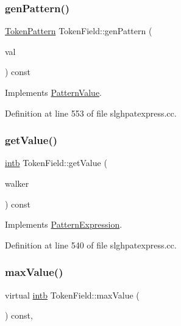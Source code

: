 \subsubsection{\texorpdfstring{genPattern()}{genPattern()}}
{\footnotesize\ttfamily \mbox{\hyperlink{class_token_pattern}{Token\+Pattern}} Token\+Field\+::gen\+Pattern (\begin{DoxyParamCaption}\item[{\mbox{\hyperlink{types_8h_aa925ba3e627c2df89d5b1cfe84fb8572}{intb}}}]{val }\end{DoxyParamCaption}) const\hspace{0.3cm}{\ttfamily [virtual]}}



Implements \mbox{\hyperlink{class_pattern_value_acc5a0c3b740a93e6ed5d3882c960ef98}{Pattern\+Value}}.



Definition at line 553 of file slghpatexpress.\+cc.

\mbox{\label{class_token_field_aacb276169a305bf24aa2fd23795c0d12}} 
\subsubsection{\texorpdfstring{getValue()}{getValue()}}
{\footnotesize\ttfamily \mbox{\hyperlink{types_8h_aa925ba3e627c2df89d5b1cfe84fb8572}{intb}} Token\+Field\+::get\+Value (\begin{DoxyParamCaption}\item[{\mbox{\hyperlink{class_parser_walker}{Parser\+Walker}} \&}]{walker }\end{DoxyParamCaption}) const\hspace{0.3cm}{\ttfamily [virtual]}}



Implements \mbox{\hyperlink{class_pattern_expression_a8332c6ea4c5a7e9dfc690df2a6458bb8}{Pattern\+Expression}}.



Definition at line 540 of file slghpatexpress.\+cc.

\mbox{\label{class_token_field_ad42951c882a6013b44a7632fc60ae5d6}} 
\subsubsection{\texorpdfstring{maxValue()}{maxValue()}}
{\footnotesize\ttfamily virtual \mbox{\hyperlink{types_8h_aa925ba3e627c2df89d5b1cfe84fb8572}{intb}} Token\+Field\+::max\+Value (\begin{DoxyParamCaption}\item[{void}]{ }\end{DoxyParamCaption}) const\hspace{0.3cm}{\ttfamily [inline]}, {\ttfamily [virtual]}}




